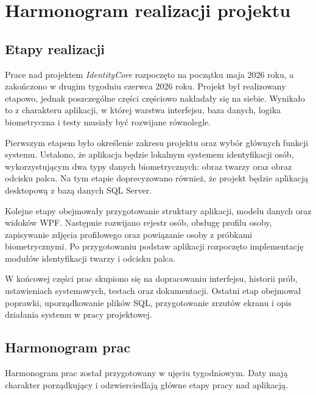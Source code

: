 \chapter{Harmonogram realizacji projektu}
\label{chap:harmonogram}

\section{Etapy realizacji}

Prace nad projektem \textit{IdentityCore} rozpoczęto na początku maja 2026 roku, a zakończono w drugim tygodniu czerwca 2026 roku. Projekt był realizowany etapowo, jednak poszczególne części częściowo nakładały się na siebie. Wynikało to z charakteru aplikacji, w której warstwa interfejsu, baza danych, logika biometryczna i testy musiały być rozwijane równolegle.

Pierwszym etapem było określenie zakresu projektu oraz wybór głównych funkcji systemu. Ustalono, że aplikacja będzie lokalnym systemem identyfikacji osób, wykorzystującym dwa typy danych biometrycznych: obraz twarzy oraz obraz odcisku palca. Na tym etapie doprecyzowano również, że projekt będzie aplikacją desktopową z bazą danych SQL Server.

Kolejne etapy obejmowały przygotowanie struktury aplikacji, modelu danych oraz widoków WPF. Następnie rozwijano rejestr osób, obsługę profilu osoby, zapisywanie zdjęcia profilowego oraz powiązanie osoby z próbkami biometrycznymi. Po przygotowaniu podstaw aplikacji rozpoczęto implementację modułów identyfikacji twarzy i odcisku palca.

W końcowej części prac skupiono się na dopracowaniu interfejsu, historii prób, ustawieniach systemowych, testach oraz dokumentacji. Ostatni etap obejmował poprawki, uporządkowanie plików SQL, przygotowanie zrzutów ekranu i opis działania systemu w pracy projektowej.

\section{Harmonogram prac}

Harmonogram prac został przygotowany w ujęciu tygodniowym. Daty mają charakter porządkujący i odzwierciedlają główne etapy pracy nad aplikacją.

